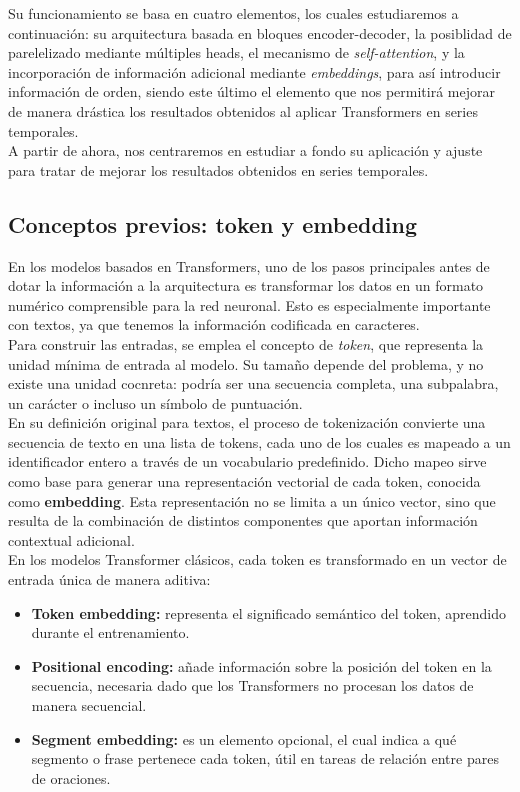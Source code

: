 Su funcionamiento se basa en cuatro elementos, los cuales estudiaremos a continuación: su arquitectura basada en bloques encoder-decoder, la posiblidad de parelelizado mediante múltiples heads, el mecanismo de \textit{self-attention}, y la incorporación de información adicional mediante \textit{embeddings}, para así introducir información de orden, siendo este último el elemento que nos permitirá mejorar de manera drástica los resultados obtenidos al aplicar Transformers en series temporales.\\

A partir de ahora, nos centraremos en estudiar a fondo su aplicación y ajuste para tratar de mejorar los resultados obtenidos en series temporales.


\subsection{Conceptos previos: token y embedding}

En los modelos basados en Transformers, uno de los pasos principales antes de dotar la información a la arquitectura es transformar los datos en un formato numérico comprensible para la red neuronal. Esto es especialmente importante con textos, ya que tenemos la información codificada en caracteres.\\

Para construir las entradas, se emplea el concepto de \textit{token}, que representa la unidad mínima de entrada al modelo. Su tamaño depende del problema, y no existe una unidad cocnreta: podría ser una secuencia completa, una subpalabra, un carácter o incluso un símbolo de puntuación.\\

En su definición original para textos, el proceso de tokenización convierte una secuencia de texto en una lista de tokens, cada uno de los cuales es mapeado a un identificador entero a través de un vocabulario predefinido. Dicho mapeo sirve como base para generar una representación vectorial de cada token, conocida como \textbf{embedding}. Esta representación no se limita a un único vector, sino que resulta de la combinación de distintos componentes que aportan información contextual adicional.\\

En los modelos Transformer clásicos, cada token es transformado en un vector de entrada única de manera aditiva:

\begin{itemize}
	\item \textbf{Token embedding:} representa el significado semántico del token, aprendido durante el entrenamiento.
	\item \textbf{Positional encoding:} añade información sobre la posición del token en la secuencia, necesaria dado que los Transformers no procesan los datos de manera secuencial.
	\item \textbf{Segment embedding:} es un elemento opcional, el cual indica a qué segmento o frase pertenece cada token, útil en tareas de relación entre pares de oraciones.
\end{itemize}

